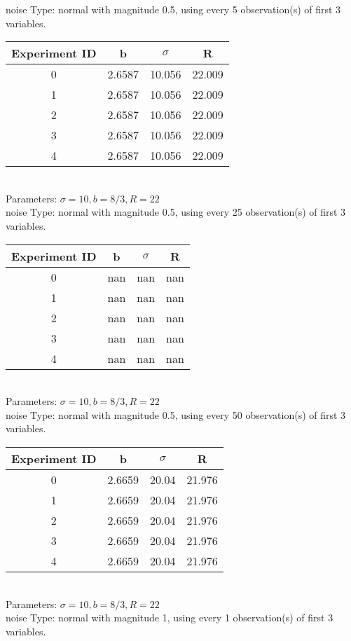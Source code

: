 \begin{multicols}{3}
noise Type: normal with magnitude 0.5, using every 5 observation(s) of first 3 variables.\\
\begin{tabular}{cccc}
\hline Experiment ID & b & $\sigma$ & R \\ \hline 
0 & 2.6587 & 10.056 & 22.009\\ \hline 
 1 & 2.6587 & 10.056 & 22.009\\ \hline 
 2 & 2.6587 & 10.056 & 22.009\\ \hline 
 3 & 2.6587 & 10.056 & 22.009\\ \hline 
 4 & 2.6587 & 10.056 & 22.009\\ \hline 
 \end{tabular}\\
Parameters: $\sigma=10, b=8/3, R=22$\\
noise Type: normal with magnitude 0.5, using every 25 observation(s) of first 3 variables.\\
\begin{tabular}{cccc}
\hline Experiment ID & b & $\sigma$ & R \\ \hline 
0 & nan & nan & nan\\ \hline 
 1 & nan & nan & nan\\ \hline 
 2 & nan & nan & nan\\ \hline 
 3 & nan & nan & nan\\ \hline 
 4 & nan & nan & nan\\ \hline 
 \end{tabular}\\
Parameters: $\sigma=10, b=8/3, R=22$\\
noise Type: normal with magnitude 0.5, using every 50 observation(s) of first 3 variables.\\
\begin{tabular}{cccc}
\hline Experiment ID & b & $\sigma$ & R \\ \hline 
0 & 2.6659 & 20.04 & 21.976\\ \hline 
 1 & 2.6659 & 20.04 & 21.976\\ \hline 
 2 & 2.6659 & 20.04 & 21.976\\ \hline 
 3 & 2.6659 & 20.04 & 21.976\\ \hline 
 4 & 2.6659 & 20.04 & 21.976\\ \hline 
 \end{tabular}\\
Parameters: $\sigma=10, b=8/3, R=22$\\
noise Type: normal with magnitude 1, using every 1 observation(s) of first 3 variables.\\

\end{multicols}
